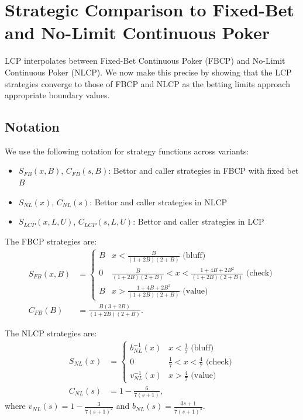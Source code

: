 \documentclass[../../main/main.tex]{subfiles}
\begin{document}
\section{Strategic Comparison to Fixed-Bet and No-Limit Continuous Poker}
\label{sec:strategic_comparison}

LCP interpolates between Fixed-Bet Continuous Poker (FBCP) and No-Limit Continuous Poker (NLCP). We now make this precise by showing that the LCP strategies converge to those of FBCP and NLCP as the betting limits approach appropriate boundary values.

\subsection{Notation}

We use the following notation for strategy functions across variants:

\begin{itemize}
    \item $S_{FB}(x, B)$, $C_{FB}(s, B)$: Bettor and caller strategies in FBCP with fixed bet $B$
    \item $S_{NL}(x)$, $C_{NL}(s)$: Bettor and caller strategies in NLCP
    \item $S_{LCP}(x, L, U)$, $C_{LCP}(s, L, U)$: Bettor and caller strategies in LCP
\end{itemize}

The FBCP strategies are:
\begin{align*}
	S_{FB}(x, B) & = \begin{cases}
    B & x < \frac{B}{(1+2B)(2+B)} \text{ (bluff)}\\
    0 & \frac{B}{(1+2B)(2+B)} < x < \frac{1 + 4B + 2B^2}{(1+2B)(2+B)} \text{ (check)}\\
    B & x > \frac{1 + 4B + 2B^2}{(1+2B)(2+B)} \text{ (value)}
\end{cases}\\
C_{FB}(B) & = \frac{B(3 +2B)}{(1+2B)(2+B)}.
\end{align*}

The NLCP strategies are:
\begin{align*}
    S_{NL}(x) &= \begin{cases}
        b_{NL}^{-1}(x) & x < \frac{1}{7} \text{ (bluff)} \\
        0 & \frac{1}{7} < x < \frac{4}{7} \text{ (check)} \\
        v_{NL}^{-1}(x) & x > \frac{4}{7} \text{ (value)}
    \end{cases} \\
    C_{NL}(s) &= 1 - \frac{6}{7 (s+1)},
\end{align*}
where $v_{NL}(s) = 1 - \frac{3}{7(s+1)^2}$ and $b_{NL}(s) = \frac{3s+1}{7(s+1)^3}$.
\end{document}
